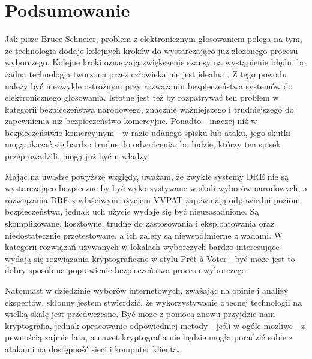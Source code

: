 \documentclass[polish]{kbk}
\begin{document}
\section{Podsumowanie}
Jak pisze Bruce Schneier, problem z elektronicznym głosowaniem polega na tym, że technologia dodaje kolejnych kroków do wystarczająco już złożonego procesu wyborczego. Kolejne kroki oznaczają zwiększenie szansy na wystąpienie błędu, bo żadna technologia tworzona przez człowieka nie jest idealna \cite{schneier}. Z tego powodu należy być niezwykle ostrożnym przy rozważaniu bezpieczeństwa systemów do elektronicznego głosowania. Istotne jest też by rozpatrywać ten problem w kategorii bezpieczeństwa narodowego, znacznie ważniejszego i trudniejszego do zapewnienia niż bezpieczeństwo komercyjne. Ponadto - inaczej niż w bezpieczeństwie komercyjnym - w razie udanego spisku lub ataku, jego skutki mogą okazać się bardzo trudne do odwrócenia, bo ludzie, którzy ten spisek przeprowadzili, mogą już być u władzy.

Mając na uwadze powyższe względy, uważam, że zwykłe systemy DRE nie są wystarczająco bezpieczne by być wykorzystywane w skali wyborów narodowych, a rozwiązania DRE z właściwym użyciem VVPAT zapewniają odpowiedni poziom bezpieczeństwa, jednak uch użycie wydaje się być nieuzasadnione. Są skomplikowane, kosztowne, trudne do zastosowania i eksploatowania oraz niedostatecznie przetestowane, a ich zalety są niewspółmierne z wadami. W kategorii rozwiązań używanych w lokalach wyborczych bardzo interesujące wydają się rozwiązania kryptograficzne w stylu Prêt à Voter - być może jest to dobry sposób na poprawienie bezpieczeństwa procesu wyborczego.

Natomiast w dziedzinie wyborów internetowych, zważając na opinie i analizy ekspertów, skłonny jestem stwierdzić, że wykorzystywanie obecnej technologii na wielką skalę jest przedwczesne. Być może z pomocą znowu przyjdzie nam kryptografia, jednak opracowanie odpowiedniej metody - jeśli w ogóle możliwe - z pewnością zajmie lata, a nawet kryptografia nie będzie mogła poradzić sobie z atakami na dostępność sieci i komputer klienta.
\end{document}

